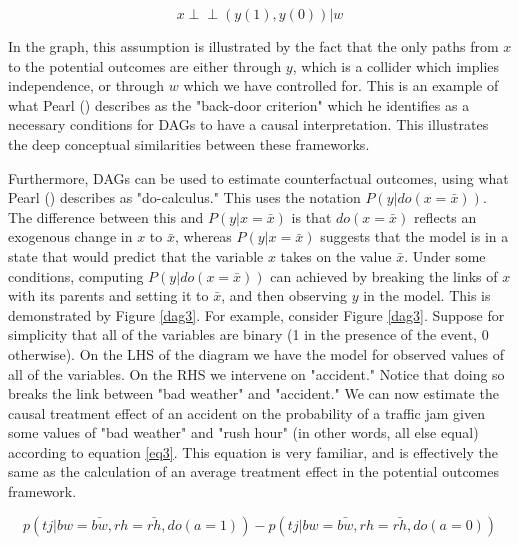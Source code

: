 \documentclass{article}
\begin{document}
\begin{equation}
  x \perp \!\!\! \perp  (y(1), y(0)) | w
\end{equation}

In the graph, this assumption is illustrated by the fact that the only paths from $x$ to the potential outcomes are either through $y$, which is a collider which implies independence, or through $w$ which we have controlled for. This is an example of what Pearl (\citeyear{pearl2018book}) describes as the "back-door criterion" which he identifies as a necessary conditions for DAGs to have a causal interpretation. This illustrates the deep conceptual similarities between these frameworks.

Furthermore, DAGs can be used to estimate counterfactual outcomes, using what Pearl (\citeyear{pearl2014probabilistic}) describes as "do-calculus." This uses the notation $P(y|do(x=\bar{x}))$. The difference between this and $P(y|x=\bar{x})$ is that $do(x=\bar{x})$ reflects an exogenous change in $x$ to $\bar{x}$, whereas $P(y|x=\bar{x})$ suggests that the model is in a state that would predict that the variable $x$ takes on the value $\bar{x}$. Under some conditions, computing $P(y|do(x=\bar{x}))$ can achieved by breaking the links of $x$ with its parents and setting it to $\bar{x}$, and then observing $y$ in the model. This is demonstrated by Figure \ref{dag3}. For example, consider Figure \ref{dag3}. Suppose for simplicity that all of the variables are binary (1 in the presence of the event, 0 otherwise). On the LHS of the diagram we have the model for observed values of all of the variables. On the RHS we intervene on "accident." Notice that doing so breaks the link between "bad weather" and "accident." We can now estimate the causal treatment effect of an accident on the probability of a traffic jam given some values of "bad weather" and "rush hour" (in other words, all else equal) according to equation \ref{eq3}. This equation is very familiar, and is effectively the same as the calculation of an average treatment effect in the potential outcomes framework.

\begin{equation}
  \label{eq3}
  p(tj | bw = \bar{bw}, rh = \bar{rh}, do(a=1)) - p(tj | bw = \bar{bw}, rh = \bar{rh}, do(a=0))
\end{equation}
\end{document}
